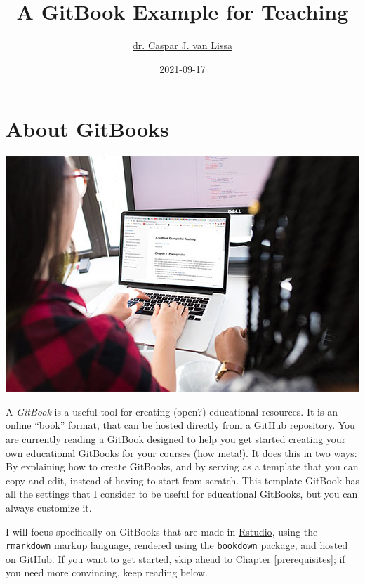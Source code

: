 \documentclass[
]{book}
\title{A GitBook Example for Teaching}
\author{\href{https://www.uu.nl/staff/CJvanLissa}{dr. Caspar J. van Lissa}}
\date{2021-09-17}
\begin{document}
\maketitle

{
\setcounter{tocdepth}{1}
\tableofcontents
}
\hypertarget{about-gitbooks}{%
\chapter{About GitBooks}\label{about-gitbooks}}

\includegraphics{./img/using_gitbook.jpeg}

A \emph{GitBook} is a useful tool for creating (open?) educational resources. It is an online ``book'' format, that can be hosted directly from a GitHub repository. You are currently reading a GitBook designed to help you get started creating your own educational GitBooks for your courses (how meta!). It does this in two ways: By explaining how to create GitBooks, and by serving as a template that you can copy and edit, instead of having to start from scratch. This template GitBook has all the settings that I consider to be useful for educational GitBooks, but you can always customize it.

I will focus specifically on GitBooks that are made in \href{https://rstudio.com}{Rstudio}, using the \href{https://rstudio.com/wp-content/uploads/2016/03/rmarkdown-cheatsheet-2.0.pdf}{\texttt{rmarkdown} markup language}, rendered using the \href{https://bookdown.org/yihui/bookdown/get-started.html}{\texttt{bookdown} package}, and hosted on \href{https://github.com/}{GitHub}. If you want to get started, skip ahead to Chapter \ref{prerequisites}; if you need more convincing, keep reading below.
\end{document}
